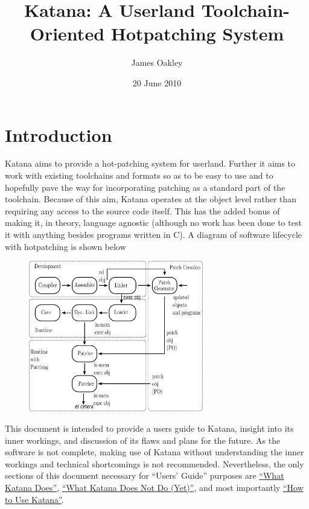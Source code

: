 \documentclass[11pt]{article}
\title{Katana: A Userland Toolchain-Oriented Hotpatching System}
\author{James Oakley}
\date{20 June 2010}
\begin{document}
\maketitle

\setcounter{tocdepth}{3}
\tableofcontents
\vspace*{1cm}


\section{Introduction}
\label{sec-1}

  Katana aims to provide a hot-patching system for userland. Further
  it aims to work with existing toolchains and formats so as to be
  easy to use and to hopefully pave the way for incorporating patching
  as a standard part of the toolchain. Because of this aim, Katana
  operates at the object level rather than requiring any access to the
  source code itself. This has the added bonus of making it, in
  theory, language agnostic (although no work has been done to test it
  with anything besides programs written in C). A diagram of software
  lifecycle with hotpatching is shown below


\begin{figure}[h!]
\includegraphics[width=3in]{./softwarelifecycle.pdf}
\end{figure}


  This document is intended to provide a users guide to Katana,
  insight into its inner workings, and discussion of its flaws and
  plans for the future. As the software is not complete, making use of
  Katana without understanding the inner workings and technical
  shortcomings is not recommended. Nevertheless, the only sections of
  this document necessary for ``Users' Guide'' purposes are 
  \hyperref[sec-3]{``What Katana Does''}, \hyperref[sec-4]{``What Katana Does Not Do (Yet)''}, and most importantly 
  \hyperref[sec-6]{``How to Use Katana''}.
 
\end{document}
